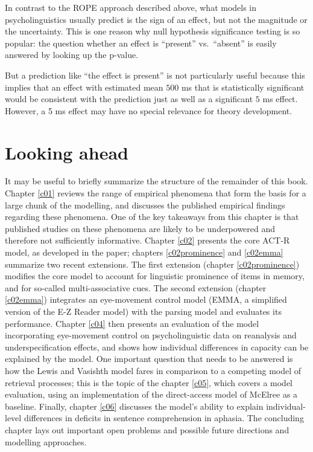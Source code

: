 \documentclass{cambridge7A}\usepackage[]{graphicx}\usepackage[]{color}
\begin{document}
In contrast to the ROPE approach described above, what models in psycholinguistics usually predict is the sign of an effect, but not the magnitude or the uncertainty. This is one reason why  null hypothesis significance testing is so popular: the question whether an effect is ``present'' vs.\ ``absent'' is easily answered by looking up the  p-value. 

But a prediction like ``the effect is present'' is not particularly useful because this implies that an effect with estimated mean $500$ ms that is statistically significant would be consistent with the prediction just as well as a significant $5$ ms effect. However, a 5 ms effect may have no special relevance for theory development.

\section{Looking ahead}

It may be useful to briefly summarize the structure of the remainder of this book. Chapter \ref{c01} reviews the range of empirical phenomena that form the basis for a large chunk of the modelling, and discusses the published empirical findings regarding these phenomena.  One of the key takeaways from this chapter is that published studies on these phenomena are likely to be  underpowered and therefore not sufficiently informative. Chapter \ref{c02} presents the core  ACT-R model, as developed in the \cite{LewisVasishth2005} paper; chapters \ref{c02prominence} and \ref{c02emma} summarize two recent extensions. The first extension (chapter \ref{c02prominence}) modifies the core model to account for linguistic  prominence of items in memory, and for so-called  multi-associative cues. The second extension (chapter \ref{c02emma}) integrates an eye-movement control model  (EMMA, a simplified version of the  E-Z Reader model) with the parsing model and evaluates its performance. Chapter \ref{c04} then presents an evaluation of the model incorporating eye-movement control on psycholinguistic data on  reanalysis and  underspecification effects, and shows how  individual differences in capacity can be explained by the model.  One important question that needs to be answered is how the Lewis and Vasishth model fares in comparison to a competing model of retrieval processes; this is the topic of the chapter \ref{c05}, which covers a model evaluation, using an implementation of the  direct-access model of McElree as a baseline.  Finally, chapter \ref{c06} discusses the model's ability to explain  individual-level differences in deficits in sentence comprehension in aphasia. The concluding chapter lays out important open problems and possible future directions and modelling approaches. 
\end{document}
